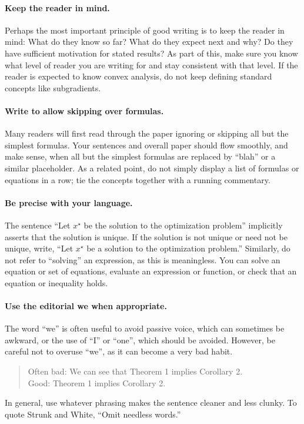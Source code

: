 \documentclass[12pt]{article}
\begin{document}
\paragraph{Keep the reader in mind.} Perhaps the most important principle of
good writing is to keep the reader in mind: What do they know so far? What do
they expect next and why? Do they have sufficient motivation for stated
results? As part of this, make sure you know what level of reader you are
writing for and stay consistent with that level. If the reader is expected to
know convex analysis, do not keep defining standard concepts like subgradients.

\paragraph{Write to allow skipping over formulas.}
Many readers will first read through the paper ignoring or skipping all but the
simplest formulas. Your sentences and overall paper should flow smoothly, and
make sense, when all but the simplest formulas are replaced by ``blah'' or a
similar placeholder.  As a related point, do not simply display a list of
formulas or equations in a row; tie the concepts together with a running
commentary.

\paragraph{Be precise with your language.}
The sentence ``Let $x^\star$ be the solution to the optimization
problem'' implicitly asserts that the solution is unique. If the solution is
not unique or need not be unique, write, ``Let $x^\star$ be a solution to the
optimization problem.'' Similarly, do not refer to ``solving'' an expression,
as this is meaningless.  You can solve an equation or set of equations,
evaluate an expression or function, or check that an equation or inequality
holds.

\paragraph{Use the editorial we when appropriate.}
The word ``we'' is often useful to avoid passive voice, which can
sometimes be awkward, or the use of ``I'' or
``one'', which should be avoided. However, be careful not to overuse
``we'', as it can become a very bad habit.
\begin{quote}
Often bad: We can see that Theorem 1 implies Corollary 2.\\
Good: Theorem 1 implies Corollary 2.
\end{quote}
In general, use whatever phrasing makes the sentence cleaner and less clunky.
To quote Strunk and White, ``Omit needless words.''
\end{document}
